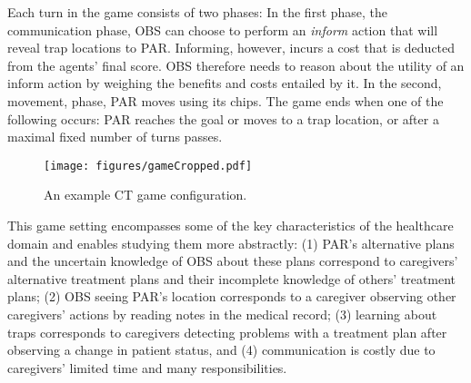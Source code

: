 Each turn in the game consists of two phases: In the first phase, the communication phase, OBS  can  choose to perform an \emph{inform} action that will reveal trap locations to PAR. Informing, however, incurs  a cost that is deducted from the agents' final score. OBS therefore needs to reason about the utility of an inform action by weighing the benefits and costs entailed by it. In the second, movement, phase, PAR moves using its chips. The game ends when one of the following occurs: PAR reaches the goal or moves to a trap location, or after a maximal fixed number of turns passes.





\begin{figure}
\centering
\texttt{[image: figures/gameCropped.pdf]}
\caption{An example CT game configuration. }
\label{fig:game}
  \vspace{-0.5cm}
\end{figure}

This game setting encompasses some of the key characteristics of the healthcare domain and enables studying them more abstractly: (1)  PAR's alternative plans and the uncertain knowledge of  OBS about these plans correspond to caregivers' alternative treatment plans and their incomplete knowledge of others' treatment plans; (2) OBS seeing  PAR's location  corresponds to a caregiver observing other caregivers' actions by reading notes in the medical record; (3) learning about traps corresponds to caregivers detecting problems with a treatment plan after observing a change in patient status, and (4) communication is costly due to caregivers'  limited time and many responsibilities. 

